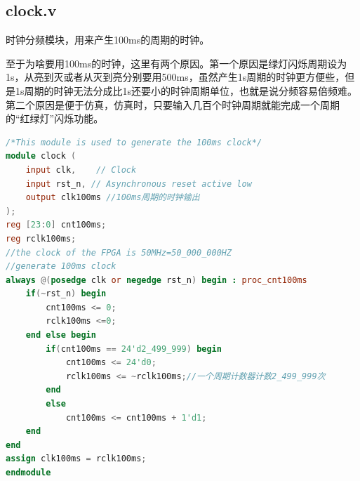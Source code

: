 \documentclass[12pt,a4paper]{article}
\begin{document}
	\subsection{clock.v}
	时钟分频模块，用来产生100ms的周期的时钟。
	
	至于为啥要用100ms的时钟，这里有两个原因。第一个原因是绿灯闪烁周期设为1s，从亮到灭或者从灭到亮分别要用500ms，虽然产生1s周期的时钟更方便些，但是1s周期的时钟无法分成比1s还要小的时钟周期单位，也就是说分频容易倍频难。第二个原因是便于仿真，仿真时，只要输入几百个时钟周期就能完成一个周期的“红绿灯”闪烁功能。
	\begin{lstlisting}[language=Verilog]
/*This module is used to generate the 100ms clock*/
module clock (
	input clk,    // Clock
	input rst_n, // Asynchronous reset active low
	output clk100ms //100ms周期的时钟输出
);
reg [23:0] cnt100ms;
reg rclk100ms;
//the clock of the FPGA is 50MHz=50_000_000HZ
//generate 100ms clock
always @(posedge clk or negedge rst_n) begin : proc_cnt100ms
	if(~rst_n) begin
		cnt100ms <= 0;
		rclk100ms <=0;
	end else begin
		if(cnt100ms == 24'd2_499_999) begin 
			cnt100ms <= 24'd0;
			rclk100ms <= ~rclk100ms;//一个周期计数器计数2_499_999次
		end
		else
			cnt100ms <= cnt100ms + 1'd1;
	end
end
assign clk100ms = rclk100ms;
endmodule	
	\end{lstlisting}
\end{document}
